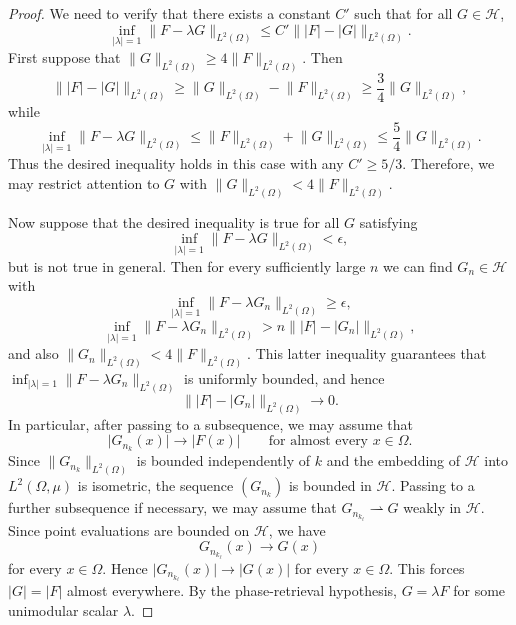 \documentclass[10pt,a4paper]{amsart}
\begin{document}
\begin{proof}
We need to verify that there exists a constant \(C'\) such that for all
\(G\in \mathcal{H}\),
\[
\inf_{\lvert \lambda \rvert=1}\lVert F-\lambda G \rVert_{L^2(\Omega)}
\le
C'\lVert \lvert F \rvert-\lvert G \rvert \rVert_{L^2(\Omega)}.
\]
First suppose that \(\lVert G \rVert_{L^2(\Omega)}\ge4\lVert F \rVert_{L^2(\Omega)}\).
Then
\[
\lVert \lvert F \rvert-\lvert G \rvert \rVert_{L^2(\Omega)}
\ge
\lVert G \rVert_{L^2(\Omega)}-\lVert F \rVert_{L^2(\Omega)}
\ge
\frac34\lVert G \rVert_{L^2(\Omega)},
\]
while
\[
\inf_{\lvert \lambda \rvert=1}\lVert F-\lambda G \rVert_{L^2(\Omega)}
\le
\lVert F \rVert_{L^2(\Omega)}+\lVert G \rVert_{L^2(\Omega)}
\le
\frac54\lVert G \rVert_{L^2(\Omega)}.
\]
Thus the desired inequality holds in this case with any \(C'\ge5/3\).
Therefore, we may restrict attention to \(G\) with
\(\lVert G \rVert_{L^2(\Omega)}<4\lVert F \rVert_{L^2(\Omega)}\).
 \vspace{0.5em}


Now suppose that the desired inequality is true for all \(G\) satisfying
\[
\inf_{\lvert \lambda \rvert=1}\lVert F-\lambda G \rVert_{L^2(\Omega)}<\epsilon,
\]
but is not true in general. Then for every sufficiently large \(n\) we can find \(G_n\in \mathcal{H}\)
with
\[
\inf_{\lvert \lambda \rvert=1}\lVert F-\lambda G_n \rVert_{L^2(\Omega)}\ge\epsilon,
\]
\[
\inf_{\lvert \lambda \rvert=1}\lVert F-\lambda G_n \rVert_{L^2(\Omega)}
>
n\lVert \lvert F \rvert-\lvert G_n \rvert \rVert_{L^2(\Omega)},
\]
and also \(\lVert G_n \rVert_{L^2(\Omega)}<4\lVert F \rVert_{L^2(\Omega)}\). This latter
inequality guarantees that
\(\inf_{\lvert \lambda \rvert=1}\lVert F-\lambda G_n \rVert_{L^2(\Omega)}\) is uniformly
bounded, and hence
\[
\lVert \lvert F \rvert-\lvert G_n \rvert \rVert_{L^2(\Omega)}\to0.
\]
In particular, after passing to a subsequence, we may assume that
\[
\lvert G_{n_k}(x) \rvert\to\lvert F(x) \rvert
\qquad\text{for almost every }x\in\Omega.
\]
Since \(\lVert G_{n_k} \rVert_{L^2(\Omega)}\) is bounded independently of \(k\) and
the embedding of \(\mathcal{H}\) into \(L^2(\Omega,\mu)\) is isometric, the sequence
\((G_{n_k})\) is bounded in \(\mathcal{H}\). Passing to a further subsequence if
necessary, we may assume that \(G_{n_{k_\ell}}\rightharpoonup G\) weakly in
\(\mathcal{H}\). Since point evaluations are bounded on \(\mathcal{H}\), we have
\[
G_{n_{k_\ell}}(x)\to G(x)
\]
for every \(x\in\Omega\). Hence \(\lvert G_{n_{k_\ell}}(x) \rvert\to\lvert G(x) \rvert\) for
every \(x\in\Omega\). This forces \(\lvert G \rvert=\lvert F \rvert\) almost everywhere. By the
phase-retrieval hypothesis, \(G=\lambda F\) for some unimodular scalar \(\lambda\).
 \vspace{0.5em}


\end{proof}
\end{document}

